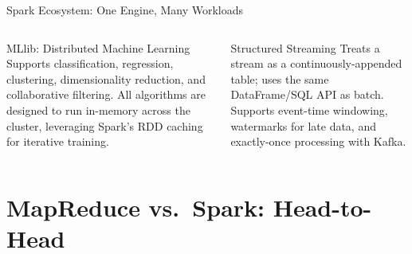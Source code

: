 \documentclass[aspectratio=169,10pt]{beamer}
\begin{document}
\begin{frame}{Spark Ecosystem: One Engine, Many Workloads}
\begin{center}
  \end{center}
  \vspace{4pt}
  \begin{columns}[T]
      \begin{block}{MLlib: Distributed Machine Learning}
        \small Supports classification, regression, clustering, dimensionality reduction, and collaborative filtering.  All algorithms are designed to run in-memory across the cluster, leveraging Spark's RDD caching for iterative training.
      \end{block}
      \begin{alertblock}{Structured Streaming}
        \small Treats a stream as a continuously-appended table; uses the same DataFrame/SQL API as batch.  Supports event-time windowing, watermarks for late data, and exactly-once processing with Kafka.
      \end{alertblock}
  \end{columns}
\end{frame}

\section{MapReduce vs.\ Spark: Head-to-Head}
\end{document}
